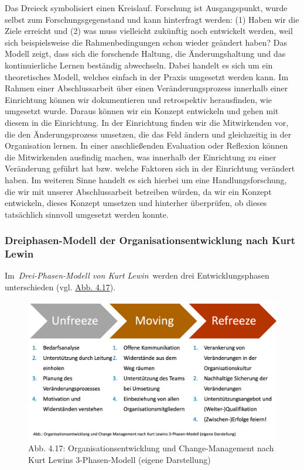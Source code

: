 \documentclass[
  letterpaper,
]{book}
\begin{document}
Das Dreieck symbolisiert einen Kreislauf. Forschung ist Ausgangspunkt,
wurde selbst zum Forschungsgegenstand und kann hinterfragt werden: (1)
Haben wir die Ziele erreicht und (2) was muss vielleicht zukünftig noch
entwickelt werden, weil sich beispielsweise die Rahmenbedingungen schon
wieder geändert haben? Das Modell zeigt, dass sich die forschende
Haltung, die Änderungshaltung und das kontinuierliche Lernen beständig
abwechseln. Dabei handelt es sich um ein theoretisches Modell, welches
einfach in der Praxis umgesetzt werden kann. Im Rahmen einer
Abschlussarbeit über einen Veränderungsprozess innerhalb einer
Einrichtung können wir dokumentieren und retrospektiv herausfinden, wie
umgesetzt wurde. Daraus können wir ein Konzept entwickeln und gehen mit
diesem in die Einrichtung. In der Einrichtung finden wir die
Mitwirkenden vor, die den Änderungsprozess umsetzen, die das Feld ändern
und gleichzeitig in der Organisation lernen. In einer anschließenden
Evaluation oder Reflexion können die Mitwirkenden ausfindig machen, was
innerhalb der Einrichtung zu einer Veränderung geführt hat bzw. welche
Faktoren sich in der Einrichtung verändert haben. Im weiteren Sinne
handelt es sich hierbei um eine Handlungsforschung, die wir mit unserer
Abschlussarbeit betreiben würden, da wir ein Konzept entwickeln, dieses
Konzept umsetzen und hinterher überprüfen, ob dieses tatsächlich
sinnvoll umgesetzt werden konnte.

\subsubsection{Dreiphasen-Modell der Organisationsentwicklung nach Kurt
Lewin}\label{dreiphasen-modell-der-organisationsentwicklung-nach-kurt-lewin}

Im~\emph{Drei-Phasen-Modell von Kurt Lewin}~werden drei
Entwicklungsphasen unterschieden (vgl. \hyperref[figure417]{Abb. 4.17}).

\begin{figure}

\includegraphics[width=0.8\linewidth,height=\textheight,keepaspectratio]{images/figure417.png} \hfill{}

\caption{Abb. 4.17: Organisationsentwicklung und Change-Management nach
Kurt Lewins 3-Phasen-Modell (eigene Darstellung)}

\end{figure}%
\end{document}
